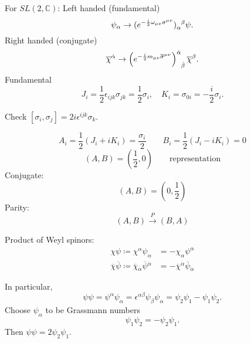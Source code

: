 For $SL(2, \mathbb{C})$:
Left handed (fundamental)
\begin{equation}
  \psi_{\alpha} \to (e^{-\frac{i}{2} \omega_{\mu\nu} \sigma^{\mu\nu}})\indices{_{\alpha}^{\beta}} \psi.
\end{equation}
Right handed (conjugate)
\begin{equation}
  \overline{\chi}{}^{\dot\alpha} \to \left( e^{-\frac{i}{2}m_{\mu\nu} \overline{\sigma}{}^{\mu\nu}} \right)\indices{^{\dot\alpha}_{\dot\beta}} \overline{\chi}{}^{\beta}.
\end{equation}
Fundamental
\begin{equation}
  J_i = \frac{1}{2}\epsilon_{ijk} \sigma_{jk} = \frac{1}{2} \sigma_{i}, \quad K_i = \sigma_{0i} = -\frac{i}{2} \sigma_i.
\end{equation}
\begin{exercise}
  Check $[\sigma_i, \sigma_j] = 2 i \epsilon^{ijk} \sigma_k$.
\end{exercise}
\begin{equation}
  A_i = \frac{1}{2} (J_i + i K_i) = \frac{\sigma_i}{2} \qquad B_i = \frac{1}{2} (J_i - i K_i) = 0
\end{equation}
\begin{equation}
  (A, B) = (\frac{1}{2}, 0) \qquad \text{representation}
\end{equation}
Conjugate:
\begin{equation}
  (A, B) = (0, \frac{1}{2})
\end{equation}
Parity:
\begin{equation}
  (A, B) \xrightarrow{P} (B, A)
\end{equation}
\begin{definition}[product]
  Product of Weyl spinors:
  \begin{align}
    \chi \psi \coloneqq \chi^{\alpha} \psi_{\alpha} &= -\chi_{\alpha} \psi^{\alpha} \\
    \overline{\chi}{}\overline{\psi}{} \coloneqq \overline{\chi}{}_{\dot\alpha} \overline{\psi}{}^{\dot\alpha} &= - \overline{\chi}{}^{\dot\alpha} \overline{\psi}{}_{\dot\alpha}
  \end{align}
\end{definition}
In particular, 
\begin{equation}
  \psi\psi = \psi^{\alpha} \psi_{\alpha} = \epsilon^{\alpha\beta} \psi_{\beta} \psi_{\alpha} = \psi_2 \psi_1 - \psi_1 \psi_2.
\end{equation}
Choose $\psi_{\alpha}$  to be Grassmann numbers
\begin{equation}
  \psi_1 \psi_2 = - \psi_2 \psi_1.
\end{equation}
Then $\psi\psi = 2 \psi_2 \psi_1$.

